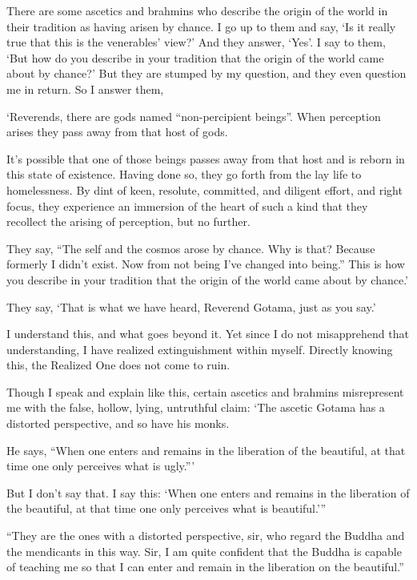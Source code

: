 \documentclass[12pt,openany]{book}%
\begin{document}
There are some ascetics and brahmins who describe the origin of the world in their tradition as having arisen by chance. I go up to them and say, ‘Is it really true that this is the venerables’ view?’ And they answer, ‘Yes’. I say to them, ‘But how do you describe in your tradition that the origin of the world came about by chance?’ But they are stumped by my question, and they even question me in return. So I answer them, 

‘Reverends, there are gods named “non-percipient beings”. When perception arises they pass away from that host of gods. 

It’s possible that one of those beings passes away from that host and is reborn in this state of existence. Having done so, they go forth from the lay life to homelessness. By dint of keen, resolute, committed, and diligent effort, and right focus, they experience an immersion of the heart of such a kind that they recollect the arising of perception, but no further. 

They say, “The self and the cosmos arose by chance. Why is that? Because formerly I didn’t exist. Now from not being I’ve changed into being.” This is how you describe in your tradition that the origin of the world came about by chance.’ 

They say, ‘That is what we have heard, Reverend Gotama, just as you say.’ 

I understand this, and what goes beyond it. Yet since I do not misapprehend that understanding, I have realized extinguishment within myself. Directly knowing this, the Realized One does not come to ruin. 

Though I speak and explain like this, certain ascetics and brahmins misrepresent me with the false, hollow, lying, untruthful claim: ‘The ascetic Gotama has a distorted perspective, and so have his monks. 

He says, “When one enters and remains in the liberation of the beautiful, at that time one only perceives what is ugly.”’ 

But I don’t say that. I say this: ‘When one enters and remains in the liberation of the beautiful, at that time one only perceives what is beautiful.’” 

“They are the ones with a distorted perspective, sir, who regard the Buddha and the mendicants in this way. Sir, I am quite confident that the Buddha is capable of teaching me so that I can enter and remain in the liberation on the beautiful.” 
\end{document}
